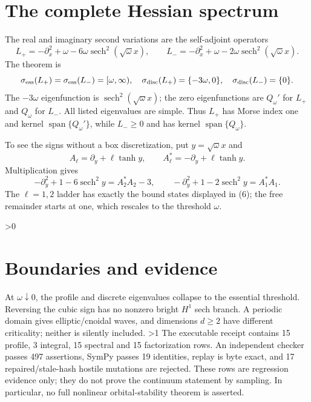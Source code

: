 \documentclass[9pt]{extarticle}
\newcommand{\sech}{\operatorname{sech}}
\begin{document}
\section{The complete Hessian spectrum}
The real and imaginary second variations are the self-adjoint operators
\begin{equation}
 L_+=-\partial_x^2+\omega-6\omega\sech^2(\sqrt\omega x),\qquad
 L_-=-\partial_x^2+\omega-2\omega\sech^2(\sqrt\omega x).
\end{equation}
The theorem is
\begin{equation}
 \sigma_{\rm ess}(L_+)=\sigma_{\rm ess}(L_-)=[\omega,\infty),
 \quad \sigma_{\rm disc}(L_+)=\{-3\omega,0\},
 \quad \sigma_{\rm disc}(L_-)=\{0\}.
\end{equation}
The \(-3\omega\) eigenfunction is \(\sech^2(\sqrt\omega x)\); the zero
eigenfunctions are \(Q_\omega'\) for \(L_+\) and \(Q_\omega\) for \(L_-\).
All listed eigenvalues are simple.  Thus \(L_+\) has Morse index one and
kernel \(\operatorname{span}\{Q_\omega'\}\), while \(L_-\ge0\) and has kernel
\(\operatorname{span}\{Q_\omega\}\).

To see the signs without a box discretization, put \(y=\sqrt\omega x\) and
\[
 A_\ell=\partial_y+\ell\tanh y,\qquad
 A_\ell^*=-\partial_y+\ell\tanh y.
\]
Multiplication gives
\begin{equation}
 -\partial_y^2+1-6\sech^2y=A_2^*A_2-3,
 \qquad -\partial_y^2+1-2\sech^2y=A_1^*A_1.
\end{equation}
The \(\ell=1,2\) ladder has exactly the bound states displayed in (6); the
free remainder starts at one, which rescales to the threshold \(\omega\).

\ifnum\CRevisionRound>0
\section{Boundaries and evidence}
At \(\omega\downarrow0\), the profile and discrete eigenvalues collapse to the
essential threshold.  Reversing the cubic sign has no nonzero bright \(H^1\)
sech branch.  A periodic domain gives elliptic/cnoidal waves, and dimensions
\(d\ge2\) have different criticality; neither is silently included.
\fi
\ifnum\CRevisionRound>1
The executable receipt contains 15 profile, 3 integral, 15 spectral and 15
factorization rows.  An independent checker passes 497 assertions, SymPy
passes 19 identities, replay is byte exact, and 17 repaired/stale-hash hostile
mutations are rejected.  These rows are regression evidence only; they do not
prove the continuum statement by sampling.  In particular, no full nonlinear
orbital-stability theorem is asserted.
\end{document}
